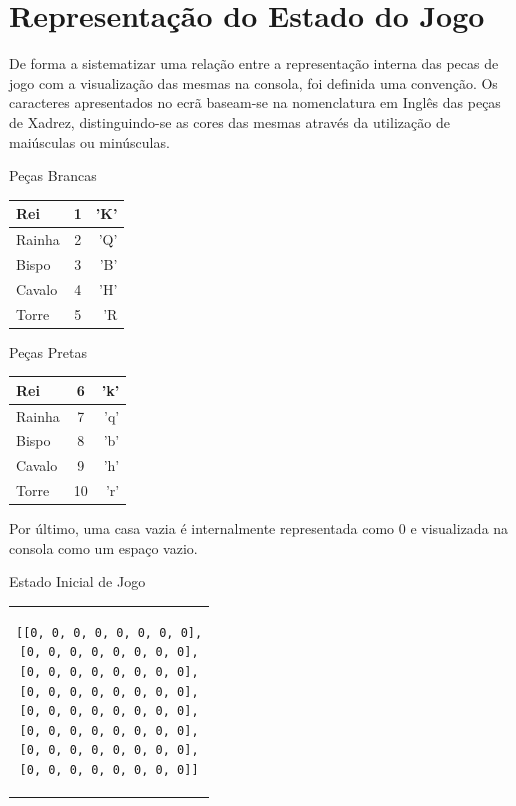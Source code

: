 \documentclass[a4paper]{article}
\begin{document}
\section{Representação do Estado do Jogo}

De forma a sistematizar uma relação entre a representação interna das pecas de jogo com a visualização das mesmas na consola, foi definida uma convenção. Os caracteres apresentados no ecrã baseam-se na nomenclatura em Inglês das peças de Xadrez, distinguindo-se as cores das mesmas através da utilização de maiúsculas ou minúsculas.

\begin{small}

\large Peças Brancas
\begin{center}
  \begin{tabular}{ l | c | r }
    Rei & 1 & 'K' \\ \hline
    Rainha & 2 & 'Q' \\ \hline
    Bispo & 3 & 'B' \\ \hline
    Cavalo & 4 & 'H' \\ \hline
    Torre & 5 & 'R \\ 
  \end{tabular}
\end{center}

\endminipage\hfill
{}

\large Peças Pretas
\begin{center}
  \begin{tabular}{ l | c | r }
    Rei & 6 & 'k' \\ \hline
    Rainha & 7 & 'q' \\ \hline
    Bispo & 8 & 'b' \\ \hline
    Cavalo & 9 & 'h' \\ \hline
    Torre & 10 & 'r' \\ 
  \end{tabular}
\end{center}

\endminipage
\end{small} \linebreak\linebreak

Por último, uma casa vazia é internalmente representada como 0 e visualizada na consola como um espaço vazio. \linebreak\linebreak


\large Estado Inicial de Jogo
\begin{center}
\begin{tabular}{c}
\begin{lstlisting}
[[0, 0, 0, 0, 0, 0, 0, 0],
[0, 0, 0, 0, 0, 0, 0, 0],
[0, 0, 0, 0, 0, 0, 0, 0],
[0, 0, 0, 0, 0, 0, 0, 0],
[0, 0, 0, 0, 0, 0, 0, 0],
[0, 0, 0, 0, 0, 0, 0, 0],
[0, 0, 0, 0, 0, 0, 0, 0],
[0, 0, 0, 0, 0, 0, 0, 0]]
\end{lstlisting}
\end{tabular}
\end{center}
\end{document}
